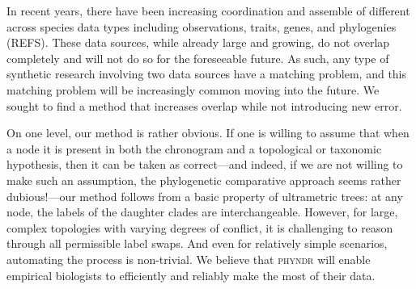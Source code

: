 \documentclass[a4paper,11pt]{article}
\begin{document}

In recent years, there have been increasing coordination and assemble of different across species data types including observations, traits, genes, and phylogenies (REFS).  These data sources, while already large and growing, do not overlap completely and will not do so for the foreseeable future.  As such, any type of synthetic research involving two data sources have a matching problem, and this matching problem will be increasingly common moving into the future.  We sought to find a method that increases overlap while not introducing new error.  

On one level, our method is rather obvious. If one is willing to assume that when a node it is present in both the chronogram and a topological or taxonomic hypothesis, then it can be taken as correct---and indeed, if we are not willing to make such an assumption, the phylogenetic comparative approach seems rather dubious!---our method follows from a basic property of ultrametric trees: at any node, the labels of the daughter clades are interchangeable. However, for large, complex topologies with varying degrees of conflict, it is challenging to reason through all permissible label swaps. And even for relatively simple scenarios, automating the process is non-trivial. We believe that \textsc{phyndr} will enable empirical biologists to efficiently and reliably make the most of their data.
\end{document}
